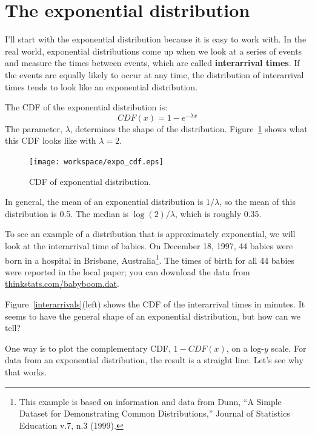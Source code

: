 \documentclass[12pt]{book}
\begin{document}
\section{The exponential distribution}

I'll start with the exponential distribution because it is
easy to work with.  In the real world, exponential distributions
come up when we look at a series of events and measure the
times between events, which are called {\bf interarrival times}.
If the events are equally likely to occur at any time, the distribution
of interarrival times tends to look like an exponential distribution.


The CDF of the exponential distribution is:
%
\[ CDF(x) = 1 - e^{-\lambda x} \]
%
The parameter, $\lambda$, determines the shape of the
distribution.  Figure~\ref{expo_cdf} shows what this CDF looks like with
$\lambda = 2$.

\begin{figure}
\centerline{\texttt{[image: workspace/expo\_cdf.eps]}}
\caption{CDF of exponential distribution.}
\label{expo_cdf}
\end{figure}

In general, the mean of an exponential distribution is $1 / \lambda$,
so the mean of this distribution is 0.5.  The median is $\log(2) / \lambda$,
which is roughly 0.35.


To see an example of a distribution that is approximately exponential,
we will look at the interarrival time of babies.
On December 18, 1997, 44 babies were born in a hospital in Brisbane,
Australia\footnote{This example is based on information and data from
  Dunn, ``A Simple Dataset for Demonstrating Common Distributions,''
  Journal of Statistics Education v.7, n.3 (1999).}.  The times of
birth for all 44 babies were reported in the local paper; you can
download the data from \url{thinkstats.com/babyboom.dat}.


Figure~\ref{interarrivals}(left) shows the CDF of the interarrival times
in minutes.  It seems to have the general shape of an exponential
distribution, but how can we tell?


One way is to plot the complementary CDF, $1 - CDF(x)$, on a
log-$y$ scale.  For data from an exponential distribution, the result
is a straight line.  Let's see why that works.
\end{document}
